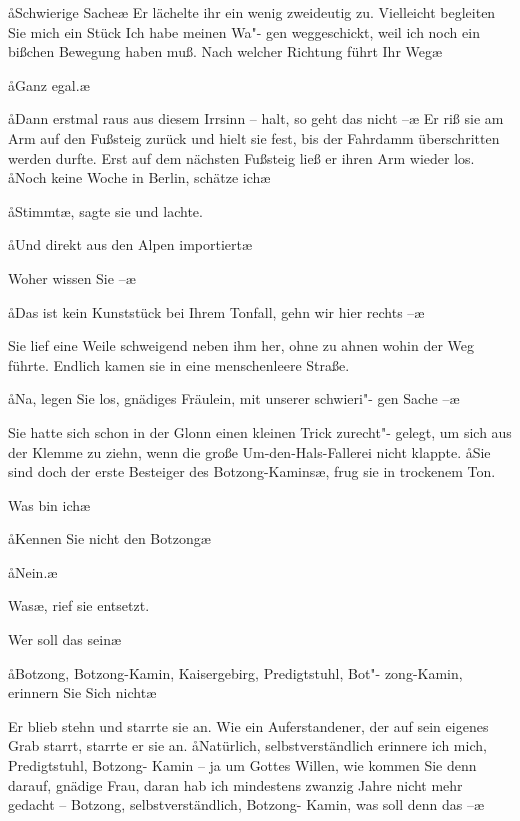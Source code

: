 \aa{}Schwierige Sache\frag{}\ae{} Er lächelte ihr ein wenig zweideutig zu.
\aanah{}Vielleicht begleiten Sie mich ein Stück\frag{} Ich habe meinen Wa"-%
gen weggeschickt, weil ich noch ein bißchen Bewegung haben
muß. Nach welcher Richtung führt Ihr Weg\frag{}\ae{}

\aa{}Ganz egal.\ae{}

\aa{}Dann erstmal raus aus diesem Irrsinn -- halt, so geht das
nicht --\ae{} Er riß sie am Arm auf den Fußsteig zurück und hielt
sie fest, bis der Fahrdamm überschritten werden durfte.
Erst auf dem nächsten Fußsteig ließ er ihren Arm wieder los.
\aa{}Noch keine Woche in Berlin, schätze ich\frag{}\ae{}

\aa{}Stimmt\ae{}, sagte sie und lachte.

\aa{}Und direkt aus den Alpen importiert\frag{}\ae{}

\aanah{}Woher wissen Sie --\ae{}

\aa{}Das ist kein Kunststück bei Ihrem Tonfall, gehn wir hier
rechts --\ae{}

Sie lief eine Weile schweigend neben ihm her, ohne zu ahnen
wohin der Weg führte. Endlich kamen sie in eine menschenleere
Straße.

\aa{}Na, legen Sie los, gnädiges Fräulein, mit unserer schwieri"-%
gen Sache --\ae{}

Sie hatte sich schon in der Glonn einen kleinen Trick zurecht"-%
gelegt, um sich aus der Klemme zu ziehn, wenn die große
Um-den-Hals-Fallerei nicht klappte. \aa{}Sie sind doch der erste
Besteiger des Botzong-Kamins\ae{}, frug sie in trockenem Ton.

\aanah{}Was bin ich\frag{}\ae{}

\aa{}Kennen Sie nicht den Botzong\frag{}\ae{}

\aa{}Nein.\ae{}

\aanah{}Was\frag{}\ae{}, rief sie entsetzt.

\aanah{}Wer soll das sein\frag{}\ae{}

\aa{}Botzong, Botzong-Kamin, Kaisergebirg, Predigtstuhl, Bot"-%
zong-Kamin, erinnern Sie Sich\eingriff{eS71-1}{Sie Sich ] Sie sich} nicht\frag{}\ae{}

Er blieb stehn und starrte sie an. Wie ein Auferstandener,
der auf sein eigenes Grab starrt, starrte er sie an. \aa{}Natürlich,
selbstverständlich erinnere ich mich, Predigtstuhl, Botzong-%
Kamin -- ja um Gottes Willen\eingriff{eS71-2}{Willen ] willen}, wie kommen Sie denn darauf,
gnädige Frau, daran hab ich mindestens zwanzig Jahre
nicht mehr gedacht -- Botzong, selbstverständlich, Botzong-%
Kamin, was soll denn das --\ae{}

